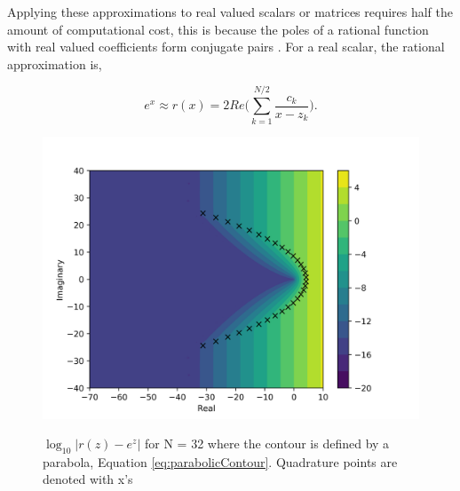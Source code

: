 Applying these approximations to real valued scalars or matrices requires half the amount of computational cost, this is because the poles of a rational function with real valued coefficients form conjugate pairs \cite{pusa2011}. For a real scalar, the rational approximation is,

\begin{equation}
    e^{x} \approx r(x) = 2Re\bigg(\sum_{k=1}^{N/2}\frac{c_{k}}{x - z_{k}}\bigg).
\end{equation}

\clearpage

\begin{figure}[p]
  \centering
  \includegraphics[width=5in]{images/chapter-3/RationApproxParabolicError32.png}\\
  \caption{$\log_{10}|r(z)-e^{z}|$ for N = 32 where the contour is defined by a parabola, Equation \ref{eq:parabolicContour}. Quadrature points are denoted with x's}
  \label{fig:complexRationalApproxParabola}
\end{figure} 

\clearpage

